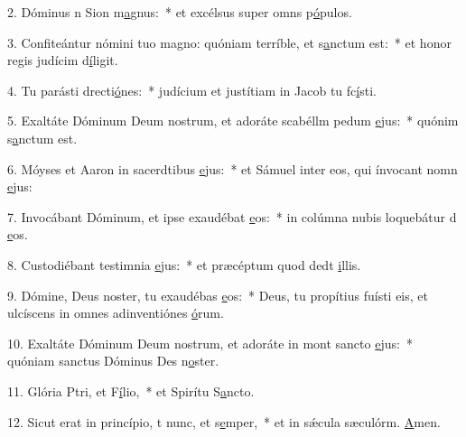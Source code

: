 2. Dóminus n Sion m\uline{a}gnus:~* et excélsus super omns p\uline{ó}pulos.\par 
3. Confiteántur nómini tuo magno: quóniam terríble, et s\uline{a}nctum est:~* et honor regis judícim d\uline{í}ligit.\par 
4. Tu parásti drecti\uline{ó}nes:~* judícium et justítiam in Jacob tu fc\uline{í}sti.\par 
5. Exaltáte Dóminum Deum nostrum, et adoráte scabéllm pedum \uline{e}jus:~* quónim s\uline{a}nctum est.\par 
6. Móyses et Aaron in sacerdtibus \uline{e}jus:~* et Sámuel inter eos, qui ínvocant nomn \uline{e}jus:\par 
7. Invocábant Dóminum, et ipse exaudébat \uline{e}os:~* in colúmna nubis loquebátur d \uline{e}os.\par 
8. Custodiébant testimnia \uline{e}jus:~* et præcéptum quod dedt \uline{i}llis.\par 
9. Dómine, Deus noster, tu exaudébas \uline{e}os:~* Deus, tu propítius fuísti eis, et ulcíscens in omnes adinventiónes \uline{ó}rum.\par 
10. Exaltáte Dóminum Deum nostrum, et adoráte in mont sancto \uline{e}jus:~* quóniam sanctus Dóminus Des n\uline{o}ster.\par 
11. Glória Ptri, et F\uline{í}lio,~* et Spirítu S\uline{a}ncto.\par 
12. Sicut erat in princípio, t nunc, et s\uline{e}mper,~* et in sǽcula sæculórm. \uline{A}men.\par 
